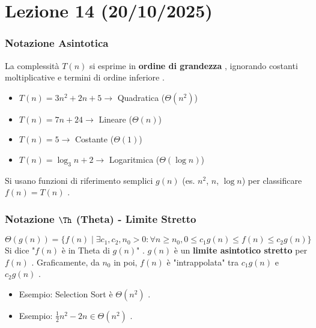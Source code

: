 
\part{Lezione 14 (20/10/2025) }

\section{Notazione Asintotica }
La complessità $T(n)$ si esprime in \textbf{ordine di grandezza} , ignorando costanti moltiplicative e termini di ordine inferiore .
\begin{itemize}
    \item $T(n) = 3n^2 + 2n + 5 \to$ Quadratica ($\Theta(n^2)$) 
    \item $T(n) = 7n + 24 \to$ Lineare ($\Theta(n)$) 
    \item $T(n) = 5 \to$ Costante ($\Theta(1)$) 
    \item $T(n) = \log_3 n + 2 \to$ Logaritmica ($\Theta(\log n)$) 
\end{itemize}
Si usano funzioni di riferimento semplici $g(n)$ (es. $n^2$, $n$, $\log n$) per classificare $f(n) = T(n)$ .

\section{Notazione $\Th$ (Theta) - Limite Stretto }
\begin{definition}
$$ \Theta(g(n)) = \{ f(n) \mid \exists c_1, c_2, n_0 > 0 : \forall n \ge n_0, 0 \le c_1 g(n) \le f(n) \le c_2 g(n) \} $$
Si dice "$f(n)$ è in Theta di $g(n)$" .
$g(n)$ è un \textbf{limite asintotico stretto} per $f(n)$ .
Graficamente, da $n_0$ in poi, $f(n)$ è "intrappolata" tra $c_1 g(n)$ e $c_2 g(n)$ .
\begin{itemize}
    \item Esempio: Selection Sort è $\Theta(n^2)$ .
    \item Esempio: $\frac{1}{2}n^2 - 2n \in \Theta(n^2)$ .
\end{itemize}
\end{definition}

